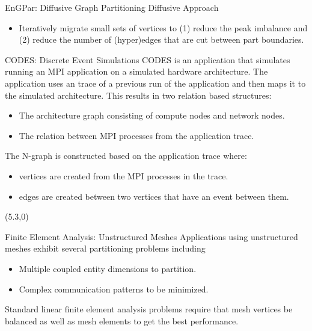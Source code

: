 \documentclass{beamer}
\begin{document}
\begin{textblock}{15.6}
\begin{textblock}{5}
\begin{block}{\centering EnGPar: Diffusive Graph Partitioning}
      Diffusive Approach
      \begin{itemize}
      \item Iteratively migrate small sets of vertices to (1) reduce the peak imbalance and (2) reduce the number of (hyper)edges that are cut between part boundaries.
      \end{itemize}
    \end{block}
    \begin{block}{\centering CODES: Discrete Event Simulations}
      CODES is an application that simulates running an MPI application on a simulated
      hardware architecture. The application uses an trace of a previous run of the
      application and then maps it to the simulated architecture. This results in two
      relation based structures:
      \begin{itemize}
      \item The architecture graph consisting of compute nodes and network nodes.
      \item The relation between MPI processes from the application trace.
      \end{itemize}
      The N-graph is constructed based on the application trace where:
      \begin{itemize}
        \item vertices are created from the MPI processes in the trace.
        \item edges are created between two vertices that have an event between them.
      \end{itemize}
    \end{block}
  \end{textblock}
  \begin{textblock}{5}(5.3,0)
    \begin{block}{\centering Finite Element Analysis: Unstructured Meshes}
      Applications using unstructured meshes exhibit several partitioning problems including
      \begin{itemize}
      \item Multiple coupled entity dimensions to partition.
      \item Complex communication patterns to be minimized.
      \end{itemize}
      Standard linear finite element analysis problems require that mesh vertices be balanced as well as mesh elements to get the best performance.\\

\end{block}
\end{textblock}
\end{textblock}
\end{document}
